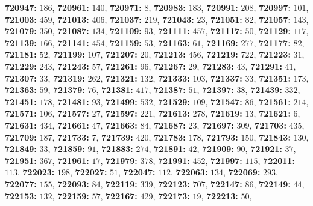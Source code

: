 \textsf{\bfseries 720947:} $186$, \textsf{\bfseries 720961:} $140$, \textsf{\bfseries 720971:} $8$, \textsf{\bfseries 720983:} $183$, \textsf{\bfseries 720991:} $208$, \textsf{\bfseries 720997:} $101$, \textsf{\bfseries 721003:} $459$, \textsf{\bfseries 721013:} $406$, \textsf{\bfseries 721037:} $219$, \textsf{\bfseries 721043:} $23$, \textsf{\bfseries 721051:} $82$, \textsf{\bfseries 721057:} $143$, \textsf{\bfseries 721079:} $350$, \textsf{\bfseries 721087:} $134$, \textsf{\bfseries 721109:} $93$, \textsf{\bfseries 721111:} $457$, \textsf{\bfseries 721117:} $50$, \textsf{\bfseries 721129:} $117$, \textsf{\bfseries 721139:} $166$, \textsf{\bfseries 721141:} $454$, \textsf{\bfseries 721159:} $53$, \textsf{\bfseries 721163:} $61$, \textsf{\bfseries 721169:} $277$, \textsf{\bfseries 721177:} $82$, \textsf{\bfseries 721181:} $52$, \textsf{\bfseries 721199:} $107$, \textsf{\bfseries 721207:} $20$, \textsf{\bfseries 721213:} $456$, \textsf{\bfseries 721219:} $722$, \textsf{\bfseries 721223:} $31$, \textsf{\bfseries 721229:} $243$, \textsf{\bfseries 721243:} $57$, \textsf{\bfseries 721261:} $96$, \textsf{\bfseries 721267:} $29$, \textsf{\bfseries 721283:} $43$, \textsf{\bfseries 721291:} $41$, \textsf{\bfseries 721307:} $33$, \textsf{\bfseries 721319:} $262$, \textsf{\bfseries 721321:} $132$, \textsf{\bfseries 721333:} $103$, \textsf{\bfseries 721337:} $33$, \textsf{\bfseries 721351:} $173$, \textsf{\bfseries 721363:} $59$, \textsf{\bfseries 721379:} $76$, \textsf{\bfseries 721381:} $417$, \textsf{\bfseries 721387:} $51$, \textsf{\bfseries 721397:} $38$, \textsf{\bfseries 721439:} $332$, \textsf{\bfseries 721451:} $178$, \textsf{\bfseries 721481:} $93$, \textsf{\bfseries 721499:} $532$, \textsf{\bfseries 721529:} $109$, \textsf{\bfseries 721547:} $86$, \textsf{\bfseries 721561:} $214$, \textsf{\bfseries 721571:} $106$, \textsf{\bfseries 721577:} $27$, \textsf{\bfseries 721597:} $221$, \textsf{\bfseries 721613:} $278$, \textsf{\bfseries 721619:} $13$, \textsf{\bfseries 721621:} $6$, \textsf{\bfseries 721631:} $434$, \textsf{\bfseries 721661:} $47$, \textsf{\bfseries 721663:} $84$, \textsf{\bfseries 721687:} $23$, \textsf{\bfseries 721697:} $309$, \textsf{\bfseries 721703:} $435$, \textsf{\bfseries 721709:} $187$, \textsf{\bfseries 721733:} $7$, \textsf{\bfseries 721739:} $420$, \textsf{\bfseries 721783:} $178$, \textsf{\bfseries 721793:} $150$, \textsf{\bfseries 721843:} $130$, \textsf{\bfseries 721849:} $33$, \textsf{\bfseries 721859:} $91$, \textsf{\bfseries 721883:} $274$, \textsf{\bfseries 721891:} $42$, \textsf{\bfseries 721909:} $90$, \textsf{\bfseries 721921:} $37$, \textsf{\bfseries 721951:} $367$, \textsf{\bfseries 721961:} $17$, \textsf{\bfseries 721979:} $378$, \textsf{\bfseries 721991:} $452$, \textsf{\bfseries 721997:} $115$, \textsf{\bfseries 722011:} $113$, \textsf{\bfseries 722023:} $198$, \textsf{\bfseries 722027:} $51$, \textsf{\bfseries 722047:} $112$, \textsf{\bfseries 722063:} $134$, \textsf{\bfseries 722069:} $293$, \textsf{\bfseries 722077:} $155$, \textsf{\bfseries 722093:} $84$, \textsf{\bfseries 722119:} $339$, \textsf{\bfseries 722123:} $707$, \textsf{\bfseries 722147:} $86$, \textsf{\bfseries 722149:} $44$, \textsf{\bfseries 722153:} $132$, \textsf{\bfseries 722159:} $57$, \textsf{\bfseries 722167:} $429$, \textsf{\bfseries 722173:} $19$, \textsf{\bfseries 722213:} $50$, 
